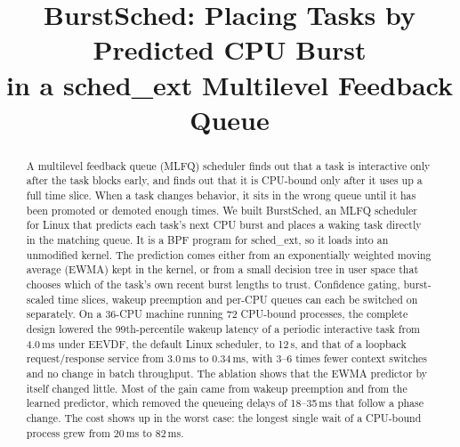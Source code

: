 \documentclass[conference]{IEEEtran}
\newcommand{\us}{\,\textmu{}s}
\newcommand{\ms}{\,ms}
\begin{document}
\title{BurstSched: Placing Tasks by Predicted CPU Burst\\in a sched\_ext Multilevel Feedback Queue}

\author{
\and
{}
}

\maketitle

\begin{abstract}
A multilevel feedback queue (MLFQ) scheduler finds out that a task is interactive only after
the task blocks early, and finds out that it is CPU-bound only after it uses up a full time
slice. When a task changes behavior, it sits in the wrong queue until it has been promoted or
demoted enough times. We built BurstSched, an MLFQ scheduler for Linux that predicts each
task's next CPU burst and places a waking task directly in the matching queue. It is a BPF
program for sched\_ext, so it loads into an unmodified kernel. The prediction comes either from
an exponentially weighted moving average (EWMA) kept in the kernel, or from a small decision
tree in user space that chooses which of the task's own recent burst lengths to trust.
Confidence gating, burst-scaled time slices, wakeup preemption and per-CPU queues can each be
switched on separately. On a 36-CPU machine running 72 CPU-bound processes, the complete design
lowered the 99th-percentile wakeup latency of a periodic interactive task from 4.0\ms{} under
EEVDF, the default Linux scheduler, to 12\us, and that of a loopback request/response service
from 3.0\ms{} to 0.34\ms, with 3--6 times fewer context switches and no change in batch
throughput. The ablation shows that the EWMA predictor by itself changed little. Most of the
gain came from wakeup preemption and from the learned predictor, which removed the queueing
delays of 18--35\ms{} that follow a phase change. The cost shows up in the worst case: the longest
single wait of a CPU-bound process grew from 20\ms{} to 82\ms.
\end{abstract}
\end{document}
